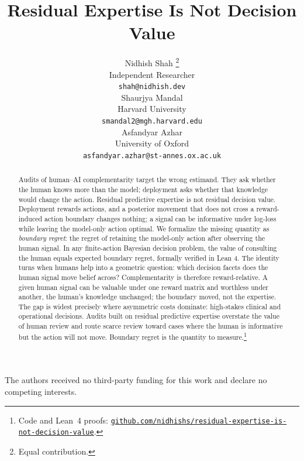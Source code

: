 \documentclass{article}
\title{Residual Expertise Is Not Decision Value}
\author{
    Nidhish Shah \thanks{Equal contribution.} \\
    Independent Researcher \\
    \texttt{shah@nidhish.dev} \\
\And
    Shaurjya Mandal \footnotemark[1] \\
    Harvard University \\
    \texttt{smandal2@mgh.harvard.edu} \\
\And
    Asfandyar Azhar \\
    University of Oxford \\
    \texttt{asfandyar.azhar@st-annes.ox.ac.uk} \\
}
\begin{document}
\maketitle
\setcounter{footnote}{0}%

\begin{abstract}
Audits of human--AI complementarity target the wrong estimand.
They ask whether the human knows more than the model; deployment asks whether that knowledge would change the action.
Residual predictive expertise is not residual decision value.
Deployment rewards actions, and a posterior movement that does not cross a reward-induced action boundary changes nothing; a signal can be informative under log-loss while leaving the model-only action optimal.
We formalize the missing quantity as \emph{boundary regret}: the regret of retaining the model-only action after observing the human signal.
In any finite-action Bayesian decision problem, the value of consulting the human equals expected boundary regret, formally verified in Lean 4.
The identity turns when humans help into a geometric question: which decision facets does the human signal move belief across?
Complementarity is therefore reward-relative.
A given human signal can be valuable under one reward matrix and worthless under another, the human's knowledge unchanged; the boundary moved, not the expertise.
The gap is widest precisely where asymmetric costs dominate: high-stakes clinical and operational decisions.
Audits built on residual predictive expertise overstate the value of human review and route scarce review toward cases where the human is informative but the action will not move.
Boundary regret is the quantity to measure.\footnote{Code and Lean~4 proofs: \href{https://github.com/nidhishs/residual-expertise-is-not-decision-value}{\texttt{github.com/nidhishs/residual-expertise-is-not-decision-value}}.}
\end{abstract}







\begin{ack}
The authors received no third-party funding for this work and declare no competing interests.
\end{ack}




\clearpage

\clearpage

\end{document}
